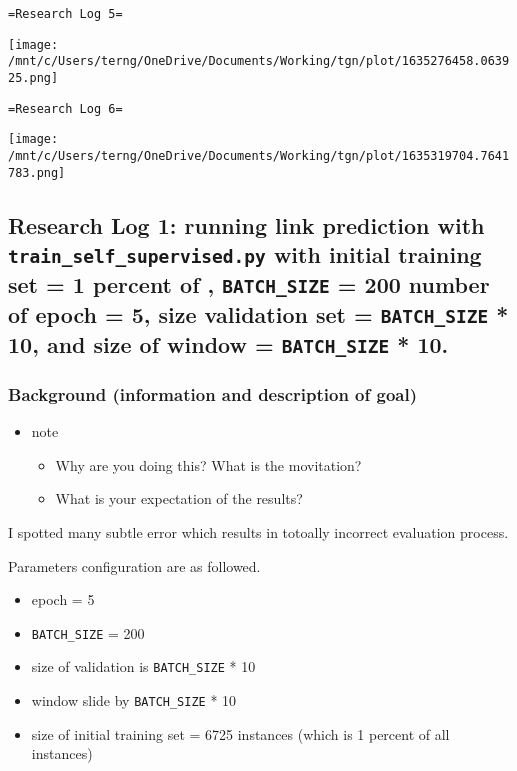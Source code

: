 \documentclass[11pt]{article}
\begin{document}
\texttt{=Research Log 5=}
\begin{center}
\texttt{[image: /mnt/c/Users/terng/OneDrive/Documents/Working/tgn/plot/1635276458.063925.png]}
\end{center}

\texttt{=Research Log 6=}
\begin{center}
\texttt{[image: /mnt/c/Users/terng/OneDrive/Documents/Working/tgn/plot/1635319704.7641783.png]}
\end{center}

\subsection{Research Log 1: running link prediction with \texttt{train\_self\_supervised.py} with initial training set = 1 percent of , \texttt{BATCH\_SIZE} = 200 number of epoch = 5, size validation set = \texttt{BATCH\_SIZE} * 10, and size of window = \texttt{BATCH\_SIZE} * 10.}
\label{sec:orgda66609}
\subsubsection{Background (information and description of goal)}
\label{sec:org4c31d7b}
\begin{itemize}
\item note
\begin{itemize}
\item Why are you doing this? What is the movitation?
\item What is your expectation of the results?
\end{itemize}
\end{itemize}
I spotted many subtle error which results in totoally incorrect evaluation process.

Parameters configuration are as followed.

\begin{itemize}
\item epoch = 5
\item \texttt{BATCH\_SIZE} = 200
\item size of validation is \texttt{BATCH\_SIZE} * 10
\item window slide by \texttt{BATCH\_SIZE} * 10
\item size of initial training set = 6725 instances (which is 1 percent of all instances)
\end{itemize}
\end{document}
